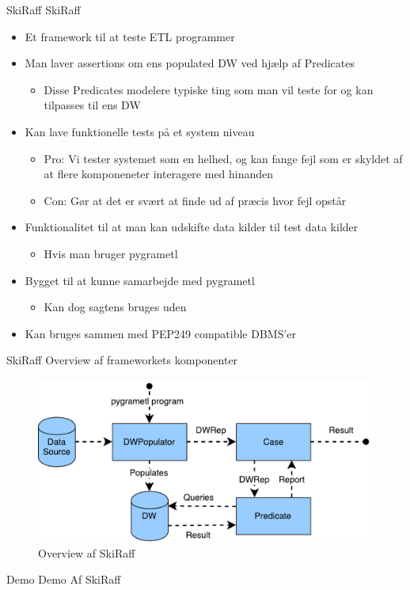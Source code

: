 \begin{frame}{SkiRaff}{}
  SkiRaff
  \begin{itemize}
  \item<2-> Et framework til at teste ETL programmer
  \item<3-> Man laver assertions om ens populated DW ved hjælp af Predicates
    \begin{itemize}
      \item Disse Predicates modelere typiske ting som man vil teste for og kan tilpasses til ens DW
    \end{itemize}
  \item<4-> Kan lave funktionelle tests på et system niveau
    \begin{itemize}
    \item Pro: Vi tester systemet som en helhed, og kan fange fejl som er skyldet af at flere komponeneter interagere med hinanden
    \item Con: Gør at det er svært at finde ud af præcis hvor fejl opstår
    \end{itemize}
  \item<5-> Funktionalitet til at man kan udskifte data kilder til test data kilder
    \begin{itemize}
    \item Hvis man bruger pygrametl
    \end{itemize}
  \item<6-> Bygget til at kunne samarbejde med pygrametl
    \begin{itemize}
    \item Kan dog sagtens bruges uden
    \end{itemize}
  \item<7-> Kan bruges sammen med PEP249 compatible DBMS'er
  \end{itemize}
\end{frame}

\begin{frame}{SkiRaff}{}
  Overview af frameworkets komponenter
  \begin{figure}
    \centering
    \includegraphics[width=1\textwidth]{figures/overview.pdf}
    \caption{Overview af SkiRaff}
    \label{overview}
  \end{figure}
\end{frame}

\begin{frame}{Demo}{}
Demo Af SkiRaff
\end{frame}
